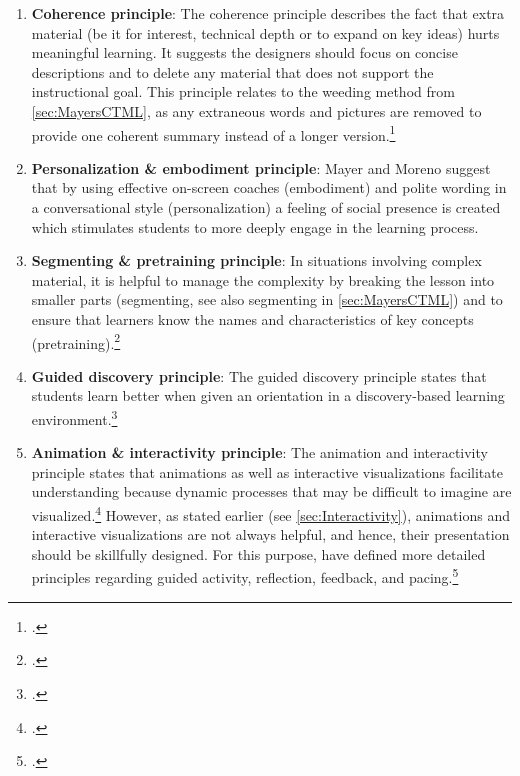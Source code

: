 \begin{enumerate}
    \item \textbf{Coherence principle}: The coherence principle describes the fact that extra material (be it for interest, technical depth or to expand on key ideas) hurts meaningful learning. It suggests the designers should focus on concise descriptions and to delete any material that does not support the instructional goal. This principle relates to the weeding method from \ref{sec:MayersCTML}, as any extraneous words and pictures are removed to provide one coherent summary instead of a longer version.\footcites[Cf.][chapter 8, paragraphs 1 et seq]{ClarkElearningscienceinstruction2016}[cf.][p.6]{MayerMultimediaLearning2009}[cf.][p.22]{MayerAnimationAidMultimedia2001}
    \item \textbf{Personalization \& embodiment principle}: Mayer and Moreno suggest that by using effective on-screen coaches (embodiment) and polite wording in a conversational style (personalization) a feeling of social presence is created which stimulates students to more deeply engage in the learning process. 
    \item \textbf{Segmenting \& pretraining principle}: In situations involving complex material, it is helpful to manage the complexity by breaking the lesson into smaller parts (segmenting, see also segmenting in \ref{sec:MayersCTML}) and to ensure that learners know the names and characteristics of key concepts (pretraining).\footcites[Cf.][chapters 9 and 10]{ClarkElearningscienceinstruction2016}
    \item \textbf{Guided discovery principle}: The guided discovery principle states that students learn better when given an orientation in a discovery-based learning environment.\footcites[Cf.][p.7]{MayerMultimediaLearning2009}
    \item \textbf{Animation \& interactivity principle}: The animation and interactivity principle states that animations as well as interactive visualizations facilitate understanding because dynamic processes that may be difficult to imagine are visualized.\footcites[Cf.][p.290]{Betrancourtanimationinteractivityprinciples2005}[cf.][p.81]{MunzerLearningmultimediapresentations2009}[cf.][p.19]{LeeScreenDesignGuidelines1999}[cf.][p.814]{MayerNineWaysReduce2003} However, as stated earlier (see \ref{sec:Interactivity}), animations and interactive visualizations are not always helpful, and hence, their presentation should be skillfully designed. For this purpose, \cite{MorenoInteractiveMultimodalLearning2007} have defined more detailed principles regarding guided activity, reflection, feedback, and pacing.\footcites[Cf.][p.292]{PatwardhanWhendoeshigher2015}[cf.][p.7]{MayerMultimediaLearning2009}[cf.][p.316]{MorenoInteractiveMultimodalLearning2007} %

\end{enumerate}
